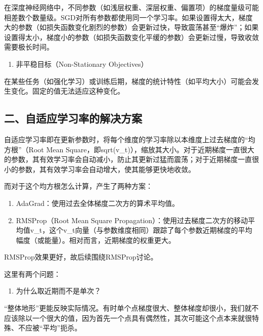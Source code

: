在深度神经网络中，不同参数（如浅层权重、深层权重、偏置项）的梯度量级可能相差数个数量级。SGD对所有参数都使用同一个学习率。如果设置得太大，梯度大的参数（如损失函数变化剧烈的参数）会更新过快，导致震荡甚至``爆炸''；如果设置得太小，梯度小的参数（如损失函数变化平缓的参数）会更新过慢，导致收敛需要极长时间。

\begin{enumerate}
\def\labelenumi{\arabic{enumi}.}
\setcounter{enumi}{1}
\tightlist
\item
  非平稳目标（Non-Stationary Objectives）
\end{enumerate}

在某些任务（如强化学习）或训练后期，梯度的统计特性（如平均大小）可能会发生变化。固定的值无法适应这种变化。

\hypertarget{ux4e8cux81eaux9002ux5e94ux5b66ux4e60ux7387ux7684ux89e3ux51b3ux65b9ux6848}{%
\subsection{二、自适应学习率的解决方案}\label{ux4e8cux81eaux9002ux5e94ux5b66ux4e60ux7387ux7684ux89e3ux51b3ux65b9ux6848}}

自适应学习率即在更新参数时，将每个维度的学习率除以本维度上过去梯度的``均方根''（Root Mean Square，即sqrt(v\_t)），缩放其大小。对于近期梯度一直很大的参数，其有效学习率会自动减小，防止其更新过猛而震荡；对于近期梯度一直很小的参数，其有效学习率会自动增大，使其能够更快地收敛。

而对于这个均方根怎么计算，产生了两种方案：

\begin{enumerate}
\def\labelenumi{\arabic{enumi}.}
\item
  AdaGrad：使用过去全体梯度二次方的算术平均值。
\item
  RMSProp（Root Mean Square Propagation）：使用过去梯度二次方的移动平均值v\_t，这个v\_t向量（与参数维度相同）跟踪了每个参数近期梯度的平均幅度（或能量）。相对而言，近期梯度的权重更大。
\end{enumerate}

RMSProp效果更好，故后续围绕RMSProp讨论。

这里有两个问题：

\begin{enumerate}
\def\labelenumi{\arabic{enumi}.}
\tightlist
\item
  为什么取近期而不是单次？
\end{enumerate}

``整体地形''更能反映实际情况。有时单个点梯度很大、整体梯度却很小，我们就不应该除以一个很大的值，因为首先一个点具有偶然性，其次可能这个点本来就很特殊、不应被``平均''扼杀。


